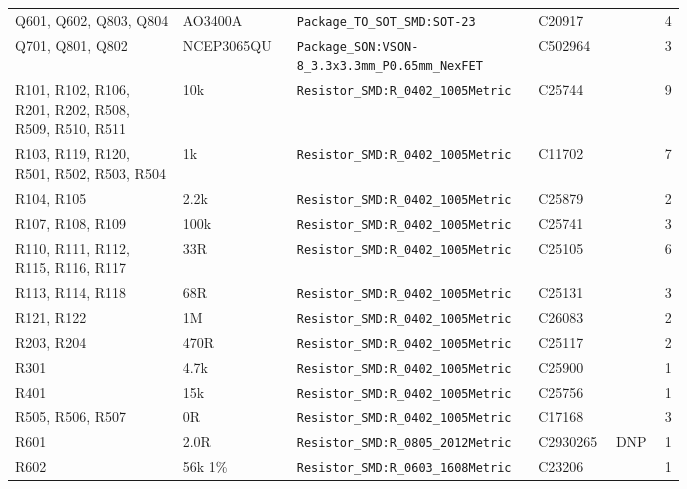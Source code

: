 {\begin{longtable}{@{}>{\raggedright\arraybackslash}p{0.25\linewidth}>{\raggedright\arraybackslash}p{0.17\linewidth}>{\raggedright\arraybackslash}p{0.36\linewidth}l l r@{}}
Q601, Q602, Q803, Q804 & AO3400A & \texttt{Package\_\allowbreak{}TO\_\allowbreak{}SOT\_\allowbreak{}SMD:\allowbreak{}SOT-23} & C20917 &  & 4\\
Q701, Q801, Q802 & NCEP3065QU & \texttt{Package\_\allowbreak{}SON:\allowbreak{}VSON-8\_\allowbreak{}3.3x3.3mm\_\allowbreak{}P0.65mm\_\allowbreak{}NexFET} & C502964 &  & 3\\
R101, R102, R106, R201, R202, R508, R509, R510, R511 & 10k & \texttt{Resistor\_\allowbreak{}SMD:\allowbreak{}R\_\allowbreak{}0402\_\allowbreak{}1005Metric} & C25744 &  & 9\\
R103, R119, R120, R501, R502, R503, R504 & 1k & \texttt{Resistor\_\allowbreak{}SMD:\allowbreak{}R\_\allowbreak{}0402\_\allowbreak{}1005Metric} & C11702 &  & 7\\
R104, R105 & 2.2k & \texttt{Resistor\_\allowbreak{}SMD:\allowbreak{}R\_\allowbreak{}0402\_\allowbreak{}1005Metric} & C25879 &  & 2\\
R107, R108, R109 & 100k & \texttt{Resistor\_\allowbreak{}SMD:\allowbreak{}R\_\allowbreak{}0402\_\allowbreak{}1005Metric} & C25741 &  & 3\\
R110, R111, R112, R115, R116, R117 & 33R & \texttt{Resistor\_\allowbreak{}SMD:\allowbreak{}R\_\allowbreak{}0402\_\allowbreak{}1005Metric} & C25105 &  & 6\\
R113, R114, R118 & 68R & \texttt{Resistor\_\allowbreak{}SMD:\allowbreak{}R\_\allowbreak{}0402\_\allowbreak{}1005Metric} & C25131 &  & 3\\
R121, R122 & 1M & \texttt{Resistor\_\allowbreak{}SMD:\allowbreak{}R\_\allowbreak{}0402\_\allowbreak{}1005Metric} & C26083 &  & 2\\
R203, R204 & 470R & \texttt{Resistor\_\allowbreak{}SMD:\allowbreak{}R\_\allowbreak{}0402\_\allowbreak{}1005Metric} & C25117 &  & 2\\
R301 & 4.7k & \texttt{Resistor\_\allowbreak{}SMD:\allowbreak{}R\_\allowbreak{}0402\_\allowbreak{}1005Metric} & C25900 &  & 1\\
R401 & 15k & \texttt{Resistor\_\allowbreak{}SMD:\allowbreak{}R\_\allowbreak{}0402\_\allowbreak{}1005Metric} & C25756 &  & 1\\
R505, R506, R507 & 0R & \texttt{Resistor\_\allowbreak{}SMD:\allowbreak{}R\_\allowbreak{}0402\_\allowbreak{}1005Metric} & C17168 &  & 3\\
R601 & 2.0R & \texttt{Resistor\_\allowbreak{}SMD:\allowbreak{}R\_\allowbreak{}0805\_\allowbreak{}2012Metric} & C2930265 & DNP & 1\\
R602 & 56k 1\% & \texttt{Resistor\_\allowbreak{}SMD:\allowbreak{}R\_\allowbreak{}0603\_\allowbreak{}1608Metric} & C23206 &  & 1\\

\end{longtable}}
